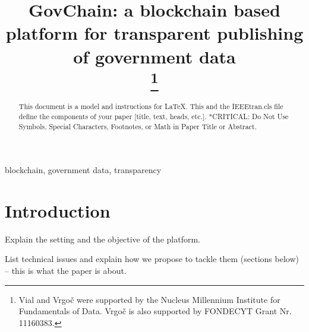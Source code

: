 \documentclass[conference]{IEEEtran}
\begin{document}
\title{GovChain: a blockchain based platform for transparent publishing of government data\\
\thanks{Vial and Vrgo\v{c} were supported by the Nucleus Millennium Institute for Fundamentals of Data. Vrgo\v{c} is also supported by FONDECYT Grant Nr. 11160383.}
}

\author{
\and
{}
\and
{}
}



\maketitle

\begin{abstract}
This document is a model and instructions for \LaTeX.
This and the IEEEtran.cls file define the components of your paper [title, text, heads, etc.]. *CRITICAL: Do Not Use Symbols, Special Characters, Footnotes, 
or Math in Paper Title or Abstract.
\end{abstract}

\begin{IEEEkeywords}
blockchain, government data, transparency
\end{IEEEkeywords}

\section{Introduction}

Explain the setting and the objective of the platform.

List technical issues and explain how we propose to tackle them (sections below) -- this is what the paper is about.
\end{document}
